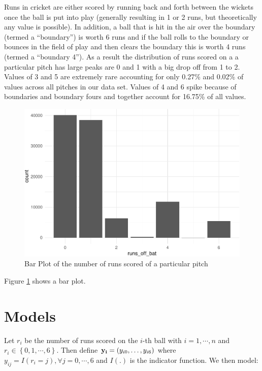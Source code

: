 \documentclass[
  12pt,
]{article}
\begin{document}
Runs in cricket are either scored by running back and forth between the
wickets once the ball is put into play (generally resulting in 1 or 2
runs, but theoretically any value is possible). In addition, a ball that
is hit in the air over the boundary (termed a ``boundary'') is worth 6
runs and if the ball rolls to the boundary or bounces in the field of
play and then clears the boundary this is worth 4 runs (termed a
``boundary 4''). As a result the distribution of runs scored on a a
particular pitch has large peaks are 0 and 1 with a big drop off from 1
to 2. Values of 3 and 5 are extremely rare accounting for only 0.27\%
and 0.02\% of values across all pitches in our data set. Values of 4 and
6 spike because of boundaries and boundary fours and together account
for 16.75\% of all values.

\begin{figure}

{\centering \includegraphics{paper_files/figure-latex/bar-1} 

}

\caption{Bar Plot of the number of runs scored of a particular pitch}\label{fig:bar}
\end{figure}

Figure \ref{fig:bar} shows a bar plot.

\hypertarget{sec:models}{%
\section{Models}\label{sec:models}}

Let \(r_i\) be the number of runs scored on the \(i\)-th ball with
\(i=1,\cdots,n\) and \(r_i \in \left\{0,1,\cdots,6\right\}\). Then
define \({\bf y_{i}} = \left(y_{i0},\ldots,y_{i6}\right)\) where
\(y_{ij} = I(r_i = j), \forall j = 0, \cdots, 6\) and \(I(.)\) is the
indicator function. We then model:
\end{document}
